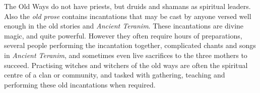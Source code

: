The Old Ways do not have priests, but druids and shamans as spiritual
leaders. Also the \emph{old prose} contains incantations that may be cast by
anyone versed well enough in the old stories and \emph{Ancient Teranim}. These
incantations are divine magic, and quite powerful. However they often require
hours of preparations, several people performing the incantation together,
complicated chants and songs in \emph{Ancient Teranim}, and sometimes even
live sacrifices to the three mothers to succeed. Practising witches and
witchers of the old ways are often the spiritual centre of a clan or
community, and tasked with gathering, teaching and performing these old
incantations when required.
